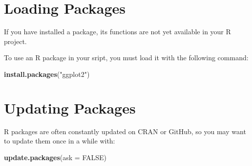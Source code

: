 \documentclass[
]{book}
\newenvironment{Shaded}{\begin{snugshade}}{\end{snugshade}}
\newcommand{\DataTypeTok}[1]{\textcolor[rgb]{0.13,0.29,0.53}{#1}}
\newcommand{\KeywordTok}[1]{\textcolor[rgb]{0.13,0.29,0.53}{\textbf{#1}}}
\newcommand{\NormalTok}[1]{#1}
\newcommand{\OtherTok}[1]{\textcolor[rgb]{0.56,0.35,0.01}{#1}}
\newcommand{\StringTok}[1]{\textcolor[rgb]{0.31,0.60,0.02}{#1}}
\begin{document}
\hypertarget{loading-packages}{%
\section{Loading Packages}\label{loading-packages}}

If you have installed a package, its functions are not yet available in your R project.

To use an R package in your sript, you must load it with the following command:

\begin{Shaded}
\begin{Highlighting}[]
\KeywordTok{install.packages}\NormalTok{(}\StringTok{"ggplot2"}\NormalTok{)}
\end{Highlighting}
\end{Shaded}

\hypertarget{updating-packages}{%
\section{Updating Packages}\label{updating-packages}}

R packages are often constantly updated on CRAN or GitHub, so you may want to update them once in a while with:

\begin{Shaded}
\begin{Highlighting}[]
\KeywordTok{update.packages}\NormalTok{(}\DataTypeTok{ask =} \OtherTok{FALSE}\NormalTok{)}
\end{Highlighting}
\end{Shaded}

  
\end{document}
